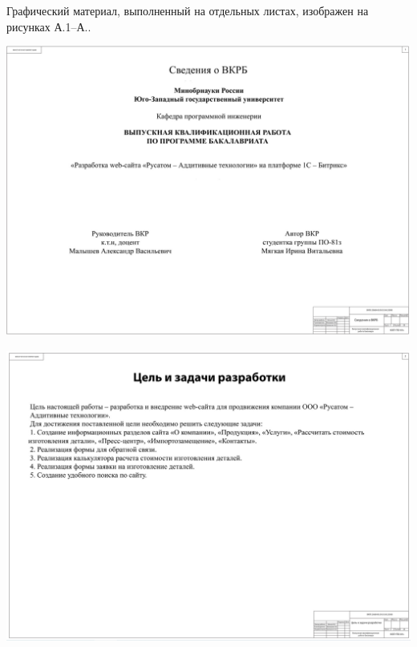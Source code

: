 
Графический материал, выполненный на отдельных листах,
изображен на рисунках А.1--А..
\setcounter{числоПлакатов}{0}

\renewcommand{\thefigure}{А.\arabic{figure}} %

\begin{landscape}
	
\begin{плакат}
	\includegraphics[width=0.82\linewidth]{images/плакат1}
	\label{fig:1}
\end{плакат}

\begin{плакат}
	\includegraphics[width=0.82\linewidth]{images/плакат2}
	\label{fig:2}
\end{плакат}


\end{landscape}
